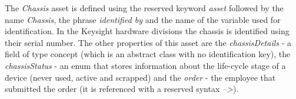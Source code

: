 

The \emph{Chassis} asset is defined using the reserved keyword \emph{asset} followed by the name \emph{Chassis}, the phrase \emph{identified by} and the name of the variable used for identification. In the Keysight hardware divisions the chassis is identified using their serial number. The other properties of this asset are the \emph{chassisDetails} - a field of type concept (which is an abstract class with no identification key), the \emph{chassisStatus} - an enum that stores information about the life-cycle stage of a device (never used, active and scrapped) and the \emph{order} - the employee that submitted the order (it is referenced with a reserved syntax \emph{-->}).





